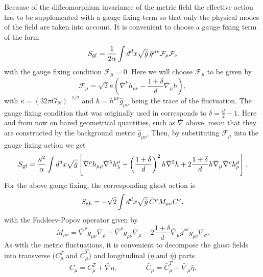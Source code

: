 \documentclass[notitlepage,eqsecnum,bm,amsmath,preprintnumbers,superscriptaddress,nofootinbib,aps,11pt]{revtex4-1}
\begin{document}
Because of the diffeomorphism invariance of the metric field the effective action has to be supplemented with a gauge fixing term so that only the physical modes of the field are taken into account. It is convenient to choose a gauge fixing term of the form
\begin{equation}
S_{\rm gf}=\frac{1}{2\alpha}\int d^dx\sqrt{\bar g}\,\bar g^{\mu\nu}\mathcal{F}_{\mu}\mathcal{F}_{\nu}\label{GFAction}
\end{equation}
with the gauge fixing condition $\mathcal{F}_{\mu}=0$. Here we will choose $\mathcal{F}_{\mu}$ to be given by 
\begin{equation}
\mathcal{F}_{\mu}=\sqrt{2}\kappa\left(\bar \nabla^{\nu}h_{\mu\nu}-\frac{1+\delta}{d}\bar \nabla_{\mu}h\right),
\end{equation}
with $\kappa=(32\pi G_N)^{-1/2}$ and $h=h^{\mu\nu}\bar g_{\mu\nu}$ being the trace of the fluctuation. 
The gauge fixing condition that was originally used in \cite{Reuter:1996cp} corresponds to $\delta=\frac{d}{2}-1$. Here and from now on bared geometrical quantities, such as $\bar \nabla$ above, mean that they are constructed by the background metric $\bar g_{\mu\nu}$. Then, by substituting $\mathcal{F}_{\mu}$ into the gauge fixing action we get
\begin{equation}
S_{\rm gf}=\frac{\kappa^2}{\alpha}\int d^dx\sqrt{\bar g}\left[\bar \nabla^{\rho}h_{\mu\rho}\bar \nabla^{\lambda}
h^{\mu}_{\lambda}-\left(\frac{1+\delta}{d}\right)^2h\bar \nabla^2h+2\frac{1+\delta}{d}h\bar \nabla_{\mu}\bar \nabla^{\rho}
h^{\mu}_{\rho}\right].\label{GaugeFixingAction}
\end{equation}
For the above gauge fixing, the corresponding ghost action is 
\begin{equation}
S_{\rm gh}=-\sqrt{2}\int d^dx\sqrt{\bar g}\,\bar C^{\mu}M_{\mu\nu}C^{\nu},\label{GhostAction}
\end{equation}
with the Faddeev-Popov operator given by 
\begin{equation}
M_{\mu\nu}=\bar \nabla^{\rho}\bar g_{\mu\nu} \nabla_{\rho}
+\bar \nabla^{\rho}\bar g_{\rho\nu} \nabla_{\mu}-2\frac{1+\delta}{d}\bar \nabla_{\mu} \bar g^{\rho\sigma}
\bar g_{\rho\nu} \nabla_{\sigma}\label{FPOperator}.
\end{equation}
As with the metric fluctuations, it is convenient to decompose the ghost fields into transverse ($C^{T}_{\mu}$ and $\bar C^{T}_{\mu}$) 
and longitudinal ($\eta$ and $\bar\eta$) parts
\begin{equation}
C_{\mu}=C_{\mu}^T+\bar \nabla\eta, \qquad \qquad \bar C_{\mu}=\bar C^T_{\mu}+\bar \nabla_{\mu}\bar\eta. \label{GhostDecomposition}
\end{equation}
\end{document}
